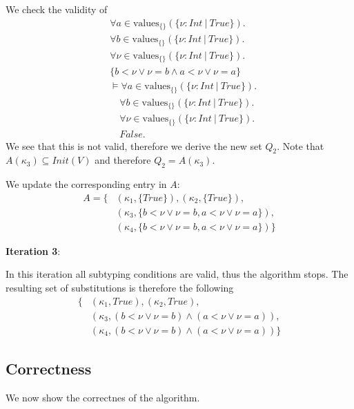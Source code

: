 \documentclass[]{scrbook}
\theoremstyle{definition}
\theoremstyle{definition}
\theoremstyle{definition}
\theoremstyle{remark}
\begin{document}
We check the validity of \[
\begin{aligned}
&\forall a\in\text{values}_{\{\}}(\{\nu:\mathit{Int}\ |\ \mathit{True}\}).\\
&\forall b\in\text{values}_{\{\}}(\{\nu:\mathit{Int}\ |\ \mathit{True}\}).\\
&\forall \nu\in\text{values}_{\{\}}(\{\nu:\mathit{Int}\ |\ \mathit{True}\}).\\
&\{b < \nu \lor \nu = b\land a < \nu \lor \nu = a\}\\
&\vDash\forall a\in\text{values}_{\{\}}(\{\nu:\mathit{Int}\ |\ \mathit{True}\}).\\
&\quad\forall b\in\text{values}_{\{\}}(\{\nu:\mathit{Int}\ |\ \mathit{True}\}).\\
&\quad\forall \nu\in\text{values}_{\{\}}(\{\nu:\mathit{Int}\ |\ \mathit{True}\}).\\
&\quad \mathit{False}.
\end{aligned}
\] We see that this is not valid, therefore we derive the new set
\(Q_2\). Note that \(A(\kappa_3)\subseteq \mathit{Init}(V)\) and
therefore \(Q_2=A(\kappa_3)\).

We update the corresponding entry in \(A\): \[
\begin{aligned}
A = \{ &(\kappa_1,\{\mathit{True}\}),(\kappa_2,\{\mathit{True}\}),\\
  &(\kappa_3, \{b < \nu \lor \nu = b, a < \nu\lor \nu = a\}),\\
  &(\kappa_4, \{b < \nu \lor \nu = b, a < \nu \lor \nu = a\})\}
\end{aligned}
\]

\textbf{Iteration 3}:

In this iteration all subtyping conditions are valid, thus the algorithm
stops. The resulting set of substitutions is therefore the following \[
\begin{aligned}
\{ &(\kappa_1,\mathit{True}),(\kappa_2,\mathit{True}),\\
  &(\kappa_3, (b < \nu \lor \nu = b) \land (a < \nu \lor \nu = a)),\\
  &(\kappa_4, (b < \nu \lor \nu = b)\land (a < \nu \lor \nu = a))\}
\end{aligned}
\]

\subsection{Correctness}\label{correctness}

We now show the correctnes of the algorithm.
\end{document}
